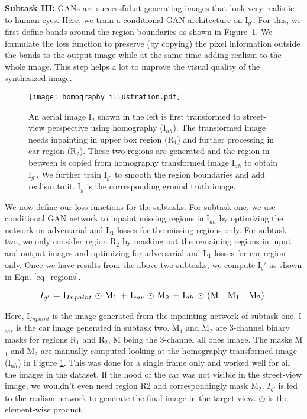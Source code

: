 \documentclass[times,twocolumn,final,authoryear]{elsarticle_modified}
\begin{document}
\textbf{Subtask III: }
GANs are successful at generating images that look very realistic to human eyes. Here, we train a conditional GAN architecture on I$_{g'}$.
For this, we first define bands around the region boundaries as shown in Figure~\ref{fig:regions}. We formulate the loss function to preserve (by copying) the pixel information outside the bands to the output image while at the same time adding realism to the whole image. This step helps a lot to improve the visual quality of the synthesized image. 

\begin{figure}[!t]
\centering
\texttt{[image: homography\_illustration.pdf]}
\caption{\label{fig:regions} An aerial image I$_{a}$ shown in the left is first transformed to street-view perspective using homography (I$_{ah}$). The transformed image needs inpainting in upper box region (R${_1}$) and further processing in car region (R${_2}$). These two regions are generated and the region in between is copied from homography transformed image I$_{ah}$ to obtain I$_{g'}$. We further train I$_{g'}$ to smooth the region boundaries and add realism to it. I$_g$ is the corresponding ground truth image.
}
\vspace{-15pt}
\end{figure}

We now define our loss functions for the subtasks.
For subtask one, we use conditional GAN network to inpaint missing regions in I$_{ah}$ by optimizing the network on adversarial and L${_1}$ losses for the missing regions only. For subtask two, we only consider region R$_2$ by masking out the remaining regions in input and output images and optimizing for adversarial and L${_1}$ losses for car region only. Once we have results from the above two subtasks, we compute I${_g'}$ as shown in Eqn. \ref{eq_regions}. 

\vspace{-15pt}

\begin{equation}\label{eq_regions}
\begin{split}
\resizebox{0.8\hsize}{!}{$I_{g'}$ = I$_{Inpaint}$ $\odot$ M$_1$ + I$_{car}$ $\odot$ M$_2$ + I$_{ah}$ $\odot$ (M - M$_1$ - M$_2$)
}\end{split}
\end{equation}

Here, I$_{Inpaint}$ is the image generated from the inpainting network of subtask one. I$_{car}$ is the car image generated in subtask two. M${_1}$ and M${_2}$ are 3-channel binary masks for regions R${_1}$ and R${_2}$, M being the 3-channel all ones image. The masks M${_1}$ and M${_2}$ are manually computed looking at the homography transformed image (I$_{ah}$) in Figure \ref{fig:regions}. This was done for a single frame only and worked well for all the images in the dataset. If the hood of the car was not visible in the street-view image, we wouldn't even need region R2 and correspondingly mask M${_2}$. $I_{g'}$ is fed to the realism network to generate the final image in the target view. $\odot$ is the element-wise product.
\end{document}
